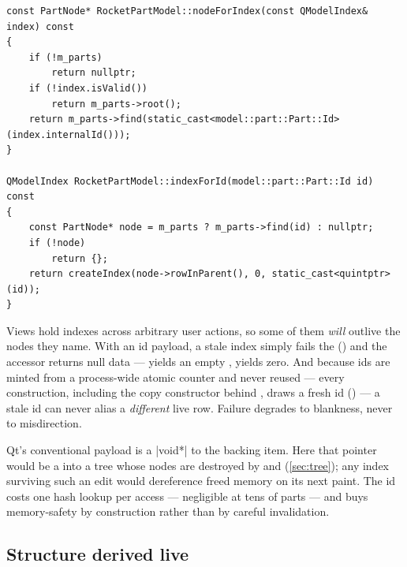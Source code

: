 \begin{listing}[htbp]
\begin{verbatim}
const PartNode* RocketPartModel::nodeForIndex(const QModelIndex& index) const
{
    if (!m_parts)
        return nullptr;
    if (!index.isValid())
        return m_parts->root();
    return m_parts->find(static_cast<model::part::Part::Id>(index.internalId()));
}

QModelIndex RocketPartModel::indexForId(model::part::Part::Id id) const
{
    const PartNode* node = m_parts ? m_parts->find(id) : nullptr;
    if (!node)
        return {};
    return createIndex(node->rowInParent(), 0, static_cast<quintptr>(id));
}
\end{verbatim}
\caption{Both directions of the identity scheme
(): an index resolves to a node by id lookup, and an event's
node id resolves to the column-0 index Qt's row operations need.}\label{lst:gui-nodeforindex}
\end{listing}

\begin{keyinsight}
Views hold indexes across arbitrary user actions, so some of them \emph{will} outlive the nodes
they name. With an id payload, a stale index simply fails the 
() and the accessor returns null data ---  yields an
empty ,  yields zero. And because ids are minted from a
process-wide atomic counter and never reused --- every  construction, including the
copy constructor behind , draws a fresh id () ---
a stale id can never alias a \emph{different} live row. Failure degrades to blankness, never to
misdirection.
\end{keyinsight}

\begin{rejected}
Qt's conventional payload is a \cppinline|void*| to the backing item. Here that pointer would be a
 into a tree whose nodes are destroyed by  and 
(\cref{sec:tree}); any index surviving such an edit would dereference freed memory on its next
paint. The id costs one hash lookup per access --- negligible at tens of parts --- and buys
memory-safety by construction rather than by careful invalidation.
\end{rejected}

\subsection{Structure derived live}\label{sec:gui-structure}


